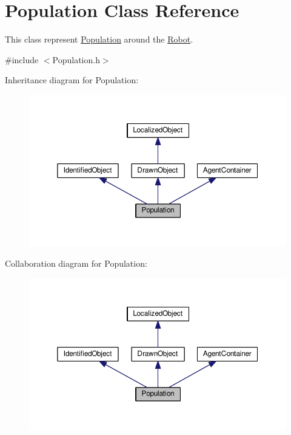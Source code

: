 \hypertarget{classPopulation}{}\section{Population Class Reference}
\label{classPopulation}


This class represent \hyperlink{classPopulation}{Population} around the \hyperlink{classRobot}{Robot}.  




{\ttfamily \#include $<$Population.\+h$>$}



Inheritance diagram for Population\+:\nopagebreak
\begin{figure}[H]
\begin{center}
\leavevmode
\includegraphics[width=350pt]{classPopulation__inherit__graph}
\end{center}
\end{figure}


Collaboration diagram for Population\+:\nopagebreak
\begin{figure}[H]
\begin{center}
\leavevmode
\includegraphics[width=350pt]{classPopulation__coll__graph}
\end{center}
\end{figure}
